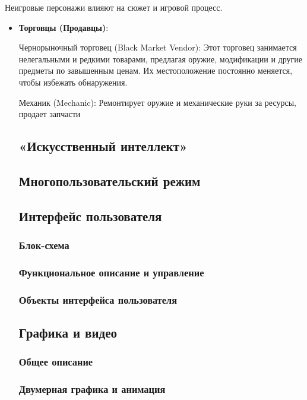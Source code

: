 \documentclass{article}
\begin{document}
Неигровые персонажи влияют на сюжет и игровой процесс.

\begin{itemize} 
    \item \textbf{Торговцы (Продавцы)}: 
    
    Чернорыночный торговец (Black Market Vendor): Этот торговец занимается нелегальными и редкими товарами, предлагая оружие, модификации и другие предметы по завышенным ценам. Их местоположение постоянно меняется, чтобы избежать обнаружения. 

    Механик (Mechanic): Ремонтирует оружие и механические руки за ресурсы, продает запчасти
\subsection{«Искусственный интеллект»}

\subsection{Многопользовательский режим}

\subsection{Интерфейс пользователя}

\subsubsection{Блок-схема}

\subsubsection{Функциональное описание и управление}

\subsubsection{Объекты интерфейса пользователя}

\subsection{Графика и видео}

\subsubsection{Общее описание}

\subsubsection{Двумерная графика и анимация}


\end{itemize}
\end{document}
